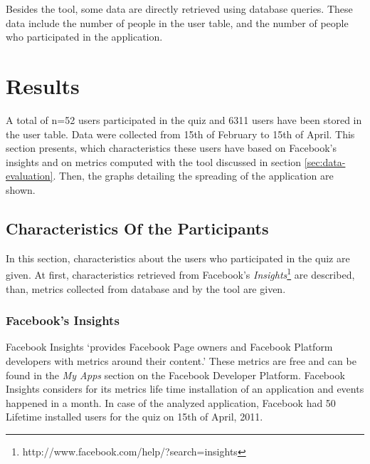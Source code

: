 \documentclass[preprint,12pt]{elsarticle}
\begin{document}
Besides the tool, some data are directly retrieved using database
queries. These data include the number of people in the user table, and
the number of people who participated in the application.





\section{Results}
\label{sec:results}
A total of n=52 users participated in the quiz and 6311 users have been
stored in the user table. Data were collected from 15th of February to
15th of April. This section presents, which
characteristics these users have based on Facebook's insights and on
metrics computed with the tool discussed in section
\ref{sec:data-evaluation}. Then, the graphs detailing the spreading of
the application are shown.

\subsection{Characteristics Of the Participants}
\label{sec:characteristics}
In this section, characteristics about the users who participated in
the quiz are given. At first, characteristics retrieved from
Facebook's
\textit{Insights}\footnote{http://www.facebook.com/help/?search=insights}
are described, than, metrics collected from database and by the tool are given.

\subsubsection{Facebook's Insights}
Facebook Insights `provides Facebook Page owners and Facebook Platform
developers with metrics around their content.'\cite{facebookInsights}
These metrics are free and can be found in the \textit{My Apps}
section on the Facebook Developer Platform.
Facebook Insights considers for its metrics life time installation of an application
and events happened in a month. In case of the analyzed application,
Facebook had 50 Lifetime installed users for the quiz on 15th of April, 2011.
\end{document}
